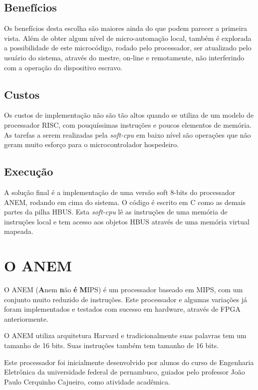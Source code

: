 \subsection{Benefícios}
Os benefícios desta escolha são maiores ainda do que podem parecer a primeira vista. Além de obter algum nível de micro-automação local, também é explorada a possibilidade de este microcódigo, rodado pelo processador, ser atualizado pelo usuário do sistema, através do mestre, on-line e remotamente, não interferindo com a operação do dispositivo escravo.

\subsection{Custos}

Os custos de implementação não são tão altos quando se utiliza de um modelo de processador RISC, com pouquíssimas instruções e poucos elementos de memória. As tarefas a serem realizadas pela \textit{soft-cpu} em baixo nível são operações que não geram muito esforço para o microcontrolador hospedeiro.

\subsection{Execução}

A solução final é a implementação de uma versão soft 8-bits do processador ANEM, rodando em cima do sistema. O código é escrito em C como as demais partes da pilha HBUS. Esta \textit{soft-cpu} lê as instruções de uma memória de instruções local e tem acesso aos objetos HBUS através de uma memória virtual mapeada.

\section{O ANEM}

O ANEM (\textbf{A}nem \textbf{n}ão \textbf{é} \textbf{M}IPS) é um processador baseado em MIPS, com um conjunto muito reduzido de instruções. Este processador e algumas variações já foram implementados e testados com sucesso em hardware, através de FPGA anteriormente.

O ANEM utiliza arquitetura Harvard e tradicionalmente suas palavras tem um tamanho de 16 bits. Suas instruções também tem tamanho de 16 bits.

Este processador foi inicialmente desenvolvido por alunos do curso de Engenharia Eletrônica da universidade federal de pernambuco, guiados pelo professor João Paulo Cerquinho Cajueiro, como atividade acadêmica.

